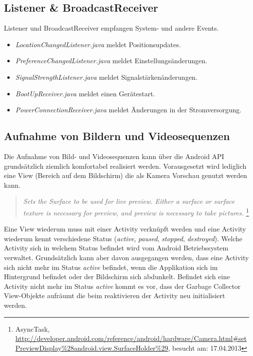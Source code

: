 \subsection{Listener \& BroadcastReceiver}
Listener und BroadcastReceiver empfangen System- und andere Events. 
\begin{itemize} [noitemsep,topsep=0pt]
	\item \textit{LocationChangedListener.java} meldet Positionsupdates.
	\item \textit{PreferenceChangedListener.java} meldet Einstellungsänderungen.
	\item \textit{SignalStrengthListener.java} meldet Signalstärkenänderungen.
	\item \textit{BootUpReceiver.java} meldet einen Gerätestart.
	\item \textit{PowerConnectionReceiver.java} meldet Änderungen in der Stromversorgung.
\end{itemize}

\subsection{Aufnahme von Bildern und Videosequenzen}
Die Aufnahme von Bild- und Videosequenzen kann über die Android API grundsätzlich ziemlich komfortabel realisiert werden. Vorausgesetzt wird lediglich eine View (Bereich auf dem Bildschirm) die als Kamera Vorschau genutzt werden kann. 

\begin{quotation}
\textit{Sets the Surface to be used for live preview. Either a surface or surface texture is necessary for preview, and preview is necessary to take pictures.} \footnote{AsyncTask, \url{http://developer.android.com/reference/android/hardware/Camera.html\#setPreviewDisplay\%28android.view.SurfaceHolder\%29}, besucht am: 17.04.2013}
\end{quotation}

Eine View wiederum muss mit einer Activity verknüpft werden und eine Activity wiederum kennt verschiedene Status (\textit{active}, \textit{paused}, \textit{stopped}, \textit{destroyed}). Welche Activity sich in welchem Status befindet wird vom Android Betriebssystem verwaltet. Grundsätzlich kann aber davon ausgegangen werden, dass eine Activity sich nicht mehr im Status \textit{active} befindet, wenn die Applikation sich im Hintergrund befindet oder der Bildschirm sich abdunkelt. Befindet sich eine Activity nicht mehr im Status \textit{active} kommt es vor, dass der Garbage Collector View-Objekte aufräumt die beim reaktivieren der Activity neu initialisiert werden.
\\

